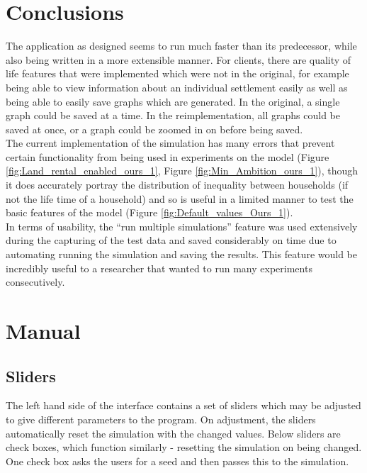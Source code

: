 \documentclass[12pt]{article}
\begin{document}
			
			
	\section{Conclusions}
		The application as designed seems to run much faster than its predecessor, while also being written in a more extensible manner. For clients, there are quality of life features that were implemented which were not in the original, for example being able to view information about an individual settlement easily as well as being able to easily save graphs which are generated. In the original, a single graph could be saved at a time. In the reimplementation, all graphs could be saved at once, or a graph could be zoomed in on before being saved.\\
		The current implementation of the simulation has many errors that prevent certain functionality from being used in experiments on the model (Figure \ref{fig:Land_rental_enabled_ours_1}, Figure \ref{fig:Min_Ambition_ours_1}), though it does accurately portray the distribution of inequality between households (if not the life time of a household) and so is useful in a limited manner to test the basic features of the model (Figure \ref{fig:Default_values_Ours_1}).\\
		In terms of usability, the “run multiple simulations” feature was used extensively during the capturing of the test data and saved considerably on time due to automating running the simulation and saving the results. This feature would be incredibly useful to a researcher that wanted to run many experiments consecutively.\\
		
	\begin{thebibliography}{9}
		
	\end{thebibliography}

	\appendix
	\section{Manual}
		\subsection{Sliders}
			The left hand side of the interface contains a set of sliders which may be adjusted to give different parameters to the program. On adjustment, the sliders automatically reset the simulation with the changed values. Below sliders are check boxes, which function similarly - resetting the simulation on being changed. One check box asks the users for a seed and then passes this to the simulation.
		
\end{document}
